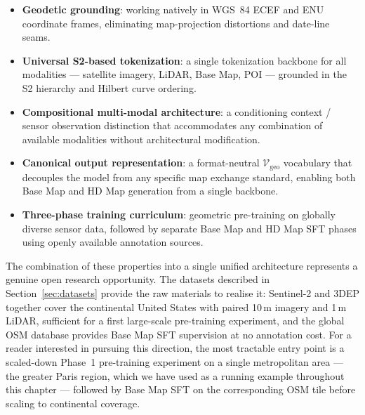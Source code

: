 \documentclass{book}
\begin{document}
\begin{itemize}
  \item \textbf{Geodetic grounding}: working natively in
    WGS~84 ECEF and ENU coordinate frames, eliminating
    map-projection distortions and date-line seams.

  \item \textbf{Universal S2-based tokenization}: a single
    tokenization backbone for all modalities --- satellite
    imagery, LiDAR, Base Map, POI --- grounded in the S2
    hierarchy and Hilbert curve ordering.

  \item \textbf{Compositional multi-modal architecture}:
    a conditioning context / sensor observation distinction
    that accommodates any combination of available modalities
    without architectural modification.

  \item \textbf{Canonical output representation}: a
    format-neutral $\mathcal{V}_{\text{geo}}$ vocabulary
    that decouples the model from any specific map exchange
    standard, enabling both Base Map and HD Map generation
    from a single backbone.

  \item \textbf{Three-phase training curriculum}: geometric
    pre-training on globally diverse sensor data, followed
    by separate Base Map and HD Map SFT phases using
    openly available annotation sources.
\end{itemize}

The combination of these properties into a single unified
architecture represents a genuine open research opportunity.
The datasets described in Section~\ref{sec:datasets} provide
the raw materials to realise it: Sentinel-2 and 3DEP
together cover the continental United States with paired
10\,m imagery and 1\,m LiDAR, sufficient for a first
large-scale pre-training experiment, and the global OSM
database provides Base Map SFT supervision at no annotation
cost.  For a reader interested in pursuing this direction,
the most tractable entry point is a scaled-down Phase~1
pre-training experiment on a single metropolitan area ---
the greater Paris region, which we have used as a running
example throughout this chapter --- followed by Base Map
SFT on the corresponding OSM tile before scaling to
continental coverage.

 
\end{document}
